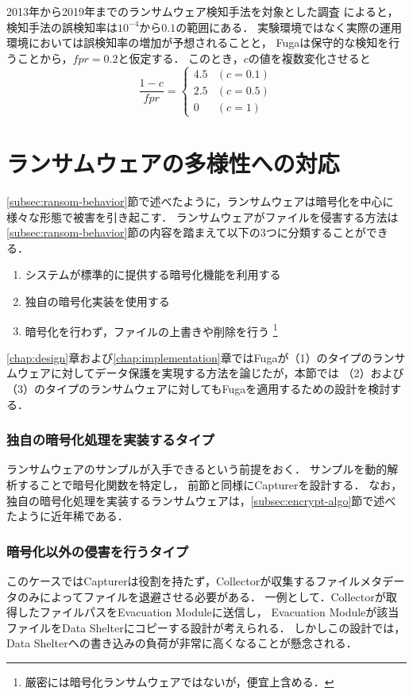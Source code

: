 2013年から2019年までのランサムウェア検知手法を対象とした調査 \cite{berrueta2019survey} によると，
検知手法の誤検知率は$10^{-4}$から$0.1$の範囲にある．
実験環境ではなく実際の運用環境においては誤検知率の増加が予想されることと，
Fugaは保守的な検知を行うことから，$fpr = 0.2$と仮定する．
このとき，$c$の値を複数変化させると
\begin{equation}
  \frac{1-c}{fpr} =
  \begin{cases}
    4.5 & (c = 0.1) \\
    2.5 & (c = 0.5) \\
    0   & (c = 1)
  \end{cases}
\end{equation}




\section{ランサムウェアの多様性への対応}
\ref{subsec:ransom-behavior}節で述べたように，ランサムウェアは暗号化を中心に様々な形態で被害を引き起こす．
ランサムウェアがファイルを侵害する方法は\ref{subsec:ransom-behavior}節の内容を踏まえて以下の3つに分類することができる．
\begin{enumerate}
  \item システムが標準的に提供する暗号化機能を利用する
  \item 独自の暗号化実装を使用する
  \item 暗号化を行わず，ファイルの上書きや削除を行う \footnote{厳密には暗号化ランサムウェアではないが，便宜上含める．}
\end{enumerate}
\ref{chap:design}章および\ref{chap:implementation}章ではFugaが（1）のタイプのランサムウェアに対してデータ保護を実現する方法を論じたが，本節では
（2）および（3）のタイプのランサムウェアに対してもFugaを適用するための設計を検討する．

\subsubsection{独自の暗号化処理を実装するタイプ}
ランサムウェアのサンプルが入手できるという前提をおく．
サンプルを動的解析することで暗号化関数を特定し，
前節と同様にCapturerを設計する．
なお，独自の暗号化処理を実装するランサムウェアは，\ref{subsec:encrypt-algo}節で述べたように近年稀である．


\subsubsection{暗号化以外の侵害を行うタイプ}
このケースではCapturerは役割を持たず，Collectorが収集するファイルメタデータのみによってファイルを退避させる必要がある．
一例として．Collectorが取得したファイルパスをEvacuation Moduleに送信し，
Evacuation Moduleが該当ファイルをData Shelterにコピーする設計が考えられる．
しかしこの設計では，Data Shelterへの書き込みの負荷が非常に高くなることが懸念される．


